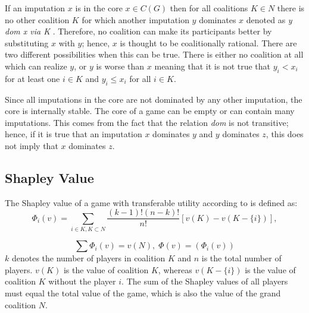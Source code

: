 {If an imputation $x$ is in the core $x \in C(G)$ then for all coalitions $K \in N$ there is no other coalition $K$ for which another imputation $y$ dominates $x$ denoted as \textit{y dom x via K} \citep{holler2006einfuhrung}. Therefore, no coalition can make its participants better by substituting $x$ with $y$; hence, $x$ is thought to be coalitionally rational. There are two different possibilities when this can be true. There is either no coalition at all which can realize $y$, or $y$ is worse than $x$ meaning that it is not true that $y_i < x_i$ for at least one $i \in K$ and $y_i \leq x_i$ for all $i \in K$. 

Since all imputations in the core are not dominated by any other imputation, the core is internally stable. The core of a game can be empty or can contain many imputations. This comes from the fact that the relation \textit{dom} is not transitive; hence, if it is true that an imputation $x$ dominates $y$ and $y$ dominates $z$, this does not imply that $x$ dominates $z$.

\subsection{Shapley Value}
\label{subsec:shapleyfund}
The Shapley value of a game with transferable utility according to \citet{holler2006einfuhrung} is defined as:
\begin{equation}
\label{eq:shapley}
\Phi_i(v) = \sum_{i \in K, K \subset N} \frac{(k-1)!(n-k)!}{n!} [ v(K) - v(K - \{i\})],
\end{equation}

\begin{equation}
\sum \Phi_i(v) = v(N), \; \Phi(v) = (\Phi_i(v))
\end{equation}
$k$ denotes the number of players in coalition $K$ and $n$ is the total number of players. $v(K)$ is the value of coalition $K$, whereas $v(K - \{i\})$ is the value of coalition $K$ without the player $i$. The sum of the Shapley values of all players must equal the total value of the game, which is also the value of the grand coalition $N$.

}
